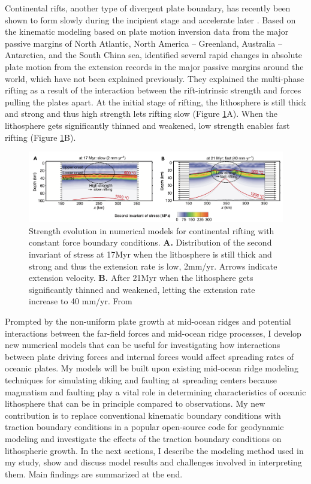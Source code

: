 \documentclass[letterpaper,12pt,notitle]{memphisthesis}                     %
\begin{document}
Continental rifts, another type of divergent plate boundary, has recently been shown to form slowly during the incipient stage and accelerate later \citep{Brune2016}. Based on the kinematic modeling based on plate motion inversion data from the major passive margins of North Atlantic, North America – Greenland, Australia – Antarctica, and the South China sea, \citet{Brune2016} identified several rapid changes in absolute plate motion from the extension records in the major passive margins around the world, which have not been explained previously. They explained the multi-phase rifting as a result of the interaction between the rift-intrinsic strength and forces pulling the plates apart. At the initial stage of rifting, the lithosphere is still thick and strong and thus high strength lets rifting slow (Figure \ref{fig:brune}A). When the lithosphere gets significantly thinned and weakened, low strength enables fast rifting (Figure \ref{fig:brune}B).
%
\begin{figure}[!htb]
	\centering
	\includegraphics[width=0.99\linewidth,trim=4 4 4 4,clip]{./figs/brune.png}
	\caption{Strength evolution in numerical models for continental rifting with constant force boundary conditions. \textbf{A.} Distribution of the second invariant of stress at 17Myr when the lithosphere is still thick and strong and thus the extension rate is low, 2mm/yr. Arrows indicate extension velocity. \textbf{B.} After 21Myr when the lithosphere gets significantly thinned and weakened, letting the extension rate increase to 40 mm/yr. From \citet{Brune2016}}
	\label{fig:brune}
\end{figure}

Prompted by the non-uniform plate growth at mid-ocean ridges and potential interactions between the far-field forces and mid-ocean ridge processes, I develop new numerical models that can be useful for investigating how interactions between plate driving forces and internal forces would affect spreading rates of oceanic plates. My models will be built upon existing mid-ocean ridge modeling techniques for simulating diking and faulting at spreading centers because magmatism and faulting play a vital role in determining characteristics of oceanic lithosphere that can be in principle compared to observations. My new contribution is to replace conventional kinematic boundary conditions with traction boundary conditions in a popular open-source code for geodynamic modeling and investigate the effects of the traction boundary conditions on lithospheric growth. In the next sections, I describe the modeling method used in my study, show and discuss model results and challenges involved in interpreting them. Main findings are summarized at the end.
\end{document}

